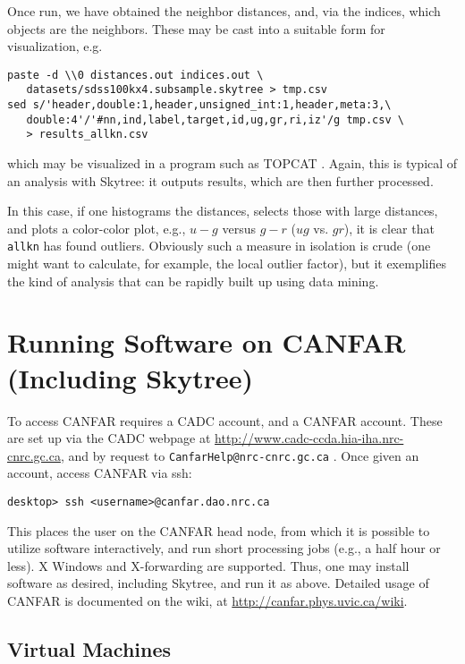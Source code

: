 Once run, we have obtained the neighbor distances, and, via the indices, which objects are the neighbors. These may be cast into a suitable form for visualization, e.g.

\begin{verbatim}
paste -d \\0 distances.out indices.out \
   datasets/sdss100kx4.subsample.skytree > tmp.csv
sed s/'header,double:1,header,unsigned_int:1,header,meta:3,\
   double:4'/'#nn,ind,label,target,id,ug,gr,ri,iz'/g tmp.csv \
   > results_allkn.csv
\end{verbatim}

\noindent which may be visualized in a program such as TOPCAT 
 \citep{taylor:topcat}. Again, this is typical of an analysis with Skytree: it outputs results, which are then further processed.

In this case, if one histograms the distances, selects those with large distances, and plots a color-color plot, e.g., $u-g$ versus $g-r$ ($ug$ vs. $gr$), it is clear that {\tt allkn} has found outliers. Obviously such a measure in isolation is crude (one might want to calculate, for example, the local outlier factor), but it exemplifies the kind of analysis that can be rapidly built up using data mining.

\section{Running Software on CANFAR (Including Skytree)}

To access CANFAR requires a CADC account, and a CANFAR account. These are set up via the CADC webpage at \url{http://www.cadc-ccda.hia-iha.nrc-cnrc.gc.ca}, and by request to {\tt CanfarHelp@nrc-cnrc.gc.ca} . Once given an account, access CANFAR via ssh:

\begin{verbatim}
desktop> ssh <username>@canfar.dao.nrc.ca
\end{verbatim}

This places the user on the CANFAR head node, from which it is possible to utilize software interactively, and run short processing jobs (e.g., a half hour or less). X Windows and X-forwarding are supported. Thus, one may install software as desired, including Skytree, and run it as above. Detailed usage of CANFAR is documented on the wiki, at \url{http://canfar.phys.uvic.ca/wiki}.

\subsection{Virtual Machines}

